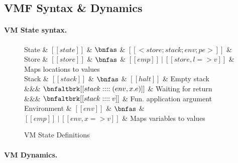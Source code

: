 \subsection{VMF Syntax \& Dynamics}


\paragraph{VM State syntax.}

\begin{figure}
  \begin{grammar}
    State
    & $[[state]]$ & $\bnfas$ & $[[ <store; stack; env; pe> ]]$ &
    \\
    Store
    & $[[store]]$ & $\bnfas$ & $[[ emp ]]~|~[[ store, l => v ]]$ & Maps locations to values
    \\
    Stack
    & $[[stack]]$ & $\bnfas$ & $[[ halt ]]$ & Empty stack
    \\
    &&& $\bnfaltbrk [[ stack :::: (env, x.e)  ]]$ & Waiting for return
    \\
    &&& $\bnfaltbrk [[ stack :::: v  ]]$ & Fun. application argument
    \\
    Environment
    & $[[env]]$   & $\bnfas$ & $[[ emp ]]~|~[[ env,   x => v ]]$ & Maps variables to values
  \end{grammar}
  \caption{VM State Definitions}
  \label{fig:state}
\end{figure}


\paragraph{VM Dynamics.}


